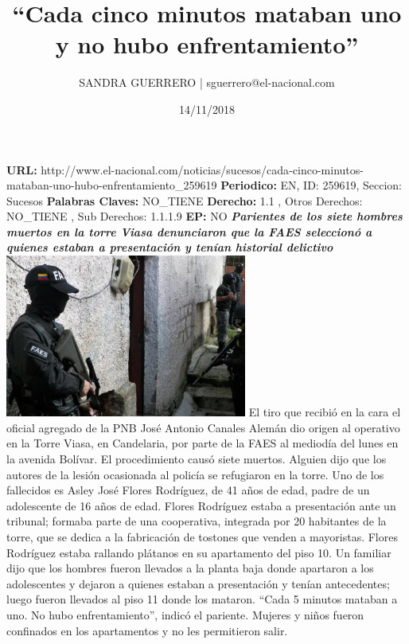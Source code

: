 \documentclass{article}%
\title{\textbf{“Cada cinco minutos mataban uno y no hubo enfrentamiento”}}%
\author{SANDRA GUERRERO | sguerrero@el{-}nacional.com}%
\date{14/11/2018}%
\begin{document}
%
\normalsize%
\maketitle%
\textbf{URL: }%
http://www.el{-}nacional.com/noticias/sucesos/cada{-}cinco{-}minutos{-}mataban{-}uno{-}hubo{-}enfrentamiento\_259619\newline%
%
\textbf{Periodico: }%
EN, %
ID: %
259619, %
Seccion: %
Sucesos\newline%
%
\textbf{Palabras Claves: }%
NO\_TIENE\newline%
%
\textbf{Derecho: }%
1.1%
, Otros Derechos: %
NO\_TIENE%
, Sub Derechos: %
1.1.1.9%
\newline%
%
\textbf{EP: }%
NO\newline%
\newline%
%
\textbf{\textit{Parientes de los siete hombres muertos en la torre Viasa denunciaron que la FAES seleccionó a quienes estaban a presentación y tenían historial delictivo}}%
\newline%
\newline%
%
\includegraphics[width=300px]{120.jpg}%
\newline%
%
El tiro que recibió en la cara el oficial agregado de la PNB José Antonio Canales Alemán dio origen al operativo en la Torre Viasa, en Candelaria, por parte de la FAES al mediodía del lunes en la avenida Bolívar. El procedimiento causó siete muertos. Alguien dijo que los autores de la lesión ocasionada al policía se refugiaron en la torre.%
\newline%
%
Uno de los fallecidos es Asley José Flores Rodríguez, de 41 años de edad, padre de un adolescente de 16 años de edad. Flores Rodríguez estaba a presentación ante un tribunal; formaba parte de una cooperativa, integrada por 20 habitantes de la torre, que se dedica a la fabricación de tostones que venden a mayoristas.%
\newline%
%
Flores Rodríguez estaba rallando plátanos en su apartamento del piso 10. Un familiar dijo que los hombres fueron llevados a la planta baja donde apartaron a los adolescentes y dejaron a quienes estaban a presentación y tenían antecedentes; luego fueron llevados al piso 11 donde los mataron. “Cada 5 minutos mataban a uno. No hubo enfrentamiento”, indicó el pariente. Mujeres y niños fueron confinados en los apartamentos y no les permitieron salir.%
\end{document}
